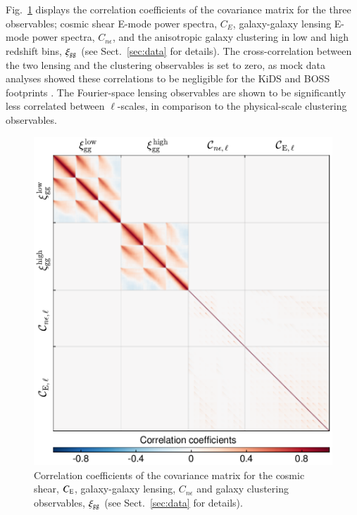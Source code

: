 \begin{appendix}
Fig.~\ref{fig:ttttpcov} displays the correlation coefficients of the \tttp covariance matrix for the three observables; cosmic shear E-mode power spectra, $C_E$, galaxy-galaxy lensing E-mode power spectra, $C_{n\epsilon}$, and the anisotropic galaxy clustering in low and high redshift bins, $\xi_{\rm gg}$ (see Sect.~\ref{sec:data} for details).   The cross-correlation between the two lensing and the clustering observables is set to zero, as mock data analyses showed these correlations to be negligible for the KiDS and BOSS footprints \citep{joachimi/etal:inprep}.  The Fourier-space lensing observables are shown to be significantly less correlated between $\ell$-scales, in comparison to the physical-scale clustering observables.
\begin{figure}
	\begin{center}
		\includegraphics[width=\columnwidth]{Data_Plots/corr_paper_wedge+aPneE+aPeeE_obs_tot_theory}
		\caption{Correlation coefficients of the \tttp covariance matrix for the cosmic shear, $C_{\rm E}$, galaxy-galaxy lensing, $C_{n\epsilon}$ and galaxy clustering observables, $\xi_{\rm gg}$ (see Sect.~\ref{sec:data} for details).}
		\label{fig:ttttpcov}
	\end{center}
\end{figure}




\end{appendix}

